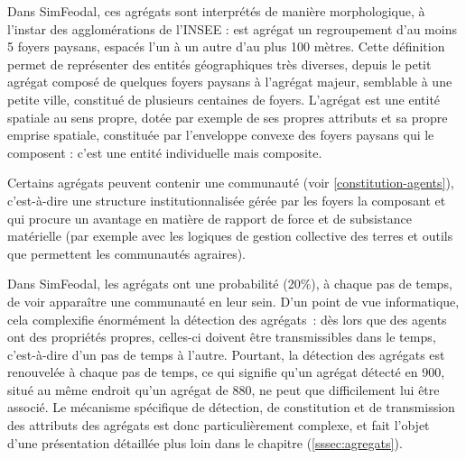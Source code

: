 \begin{tcolorbox}[breakable,left=0pt,right=0pt,top=0pt,bottom=0pt,
	colback=gray!15,colframe=gray!15,width=\dimexpr\textwidth\relax, 
	enlarge left by=0mm, boxsep=5pt,arc=0pt,outer arc=0pt]
Dans SimFeodal, ces agrégats sont interprétés de manière morphologique, à l'instar des agglomérations de l'INSEE : est agrégat un regroupement d'au moins 5 foyers paysans, espacés l'un à un autre d'au plus 100 mètres.
Cette définition permet de représenter des entités géographiques très diverses, depuis le petit agrégat composé de quelques foyers paysans à l'agrégat majeur, semblable à une petite ville, constitué de plusieurs centaines de foyers.
L'agrégat est une entité spatiale au sens propre, dotée par exemple de ses propres attributs et sa propre emprise spatiale, constituée par l'enveloppe convexe des foyers paysans qui le composent : c'est une entité individuelle mais composite.
\end{tcolorbox}

Certains agrégats peuvent contenir une \og communauté\fg{} (voir \cref{constitution-agents}), c'est-à-dire une structure institutionnalisée gérée par les foyers la composant et qui procure un avantage en matière de rapport de force et de subsistance matérielle (par exemple avec les logiques de gestion collective des terres et outils que permettent les communautés agraires).
\begin{tcolorbox}[breakable,left=0pt,right=0pt,top=0pt,bottom=0pt,
	colback=gray!15,colframe=gray!15,width=\dimexpr\textwidth\relax, 
	enlarge left by=0mm, boxsep=5pt,arc=0pt,outer arc=0pt]
Dans SimFeodal, les agrégats ont une probabilité (20\%), à chaque pas de temps, de voir apparaître une communauté en leur sein.
D'un point de vue informatique, cela complexifie énormément la détection des agrégats : dès lors que des agents ont des propriétés propres, celles-ci doivent être transmissibles dans le temps, c'est-à-dire d'un pas de temps à l'autre.
Pourtant, la détection des agrégats est renouvelée à chaque pas de temps, ce qui signifie qu'un agrégat détecté en 900, situé au même endroit qu'un agrégat de 880, ne peut que difficilement lui être associé\footnotemark.
Le mécanisme spécifique de détection, de constitution et de transmission des attributs des agrégats est donc particulièrement complexe, et fait l'objet d'une présentation détaillée plus loin dans le chapitre (\cref{sssec:agregats}).
\end{tcolorbox}

